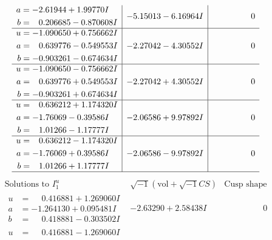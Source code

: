 \documentclass[1p]{elsarticle_modified}
\theoremstyle{definition}
\newcommand{\I}{\sqrt{-1}}
\begin{document}
$$\begin{array}{c|c|c}
\begin{aligned}
a &= -2.61944 + 1.99770 I \\
b &= \phantom{-}0.206685 - 0.870608 I\end{aligned}
 & -5.15013 - 6.16964 I & \phantom{-0.000000 } 0 \\ \hline\begin{aligned}
u &= -1.090650 + 0.756662 I \\
a &= \phantom{-}0.639776 - 0.549553 I \\
b &= -0.903261 - 0.674634 I\end{aligned}
 & -2.27042 - 4.30552 I & \phantom{-0.000000 } 0 \\ \hline\begin{aligned}
u &= -1.090650 - 0.756662 I \\
a &= \phantom{-}0.639776 + 0.549553 I \\
b &= -0.903261 + 0.674634 I\end{aligned}
 & -2.27042 + 4.30552 I & \phantom{-0.000000 } 0 \\ \hline\begin{aligned}
u &= \phantom{-}0.636212 + 1.174320 I \\
a &= -1.76069 - 0.39586 I \\
b &= \phantom{-}1.01266 - 1.17777 I\end{aligned}
 & -2.06586 + 9.97892 I & \phantom{-0.000000 } 0 \\ \hline\begin{aligned}
u &= \phantom{-}0.636212 - 1.174320 I \\
a &= -1.76069 + 0.39586 I \\
b &= \phantom{-}1.01266 + 1.17777 I\end{aligned}
 & -2.06586 - 9.97892 I & \phantom{-0.000000 } 0\\
 \hline 
 \end{array}$$\newpage$$\begin{array}{c|c|c}  
\text{Solutions to }I^u_{1}& \I (\text{vol} + \sqrt{-1}CS) & \text{Cusp shape}\\
 \hline 
\begin{aligned}
u &= \phantom{-}0.416881 + 1.269060 I \\
a &= -1.264130 + 0.095481 I \\
b &= \phantom{-}0.418881 - 0.303502 I\end{aligned}
 & -2.63290 + 2.58438 I & \phantom{-0.000000 } 0 \\ \hline\begin{aligned}
u &= \phantom{-}0.416881 - 1.269060 I \\

\end{aligned}
\end{array}$$
\end{document}
